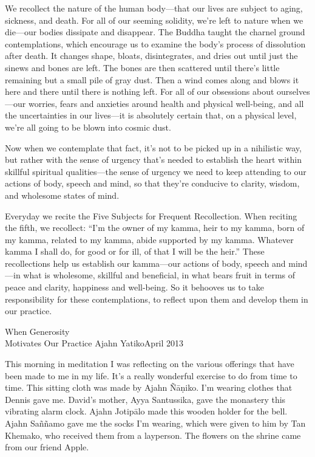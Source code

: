 We recollect the nature of the human body---that our lives are subject 
to aging, sickness, and death. For all of our seeming solidity, we're 
left to nature when we die---our bodies dissipate and disappear. The 
Buddha taught the charnel ground contemplations, which encourage us to 
examine the body's process of dissolution after death. It changes 
shape, bloats, disintegrates, and dries out until just the sinews and 
bones are left. The bones are then scattered until there's little 
remaining but a small pile of gray dust. Then a wind comes along and 
blows it here and there until there is nothing left. For all of our 
obsessions about ourselves---our worries, fears and anxieties around 
health and physical well-being, and all the uncertainties in our 
lives---it is absolutely certain that, on a physical level, we're all 
going to be blown into cosmic dust.

Now when we contemplate that fact, it's not to be picked up in a 
nihilistic way, but rather with the sense of urgency that's needed to 
establish the heart within skillful spiritual qualities---the sense of 
urgency we need to keep attending to our actions of body, speech and 
mind, so that they're conducive to clarity, wisdom, and wholesome 
states of mind.

Everyday we recite the Five Subjects for Frequent Recollection. When 
reciting the fifth, we recollect: ``I'm the owner of my kamma, heir to 
my kamma, born of my kamma, related to my kamma, abide supported by my 
kamma. Whatever kamma I shall do, for good or for ill, of that I will 
be the heir.'' These recollections help us establish our kamma---our 
actions of body, speech and mind---in what is wholesome, skillful and 
beneficial, in what bears fruit in terms of peace and clarity, 
happiness and well-being. So it behooves us to take responsibility for 
these contemplations, to reflect upon them and develop them in our 
practice.

{When Generosity\\Motivates Our Practice}
{Ajahn Yatiko}{April 2013}

This morning in meditation I was reflecting on the various offerings 
that have been made to me in my life. It's a really wonderful exercise 
to do from time to time. This sitting cloth was made by Ajahn 
Ñāṇiko. I'm wearing clothes that Dennis gave me. David's mother, 
Ayya Santussika, gave the monastery this vibrating alarm clock. Ajahn 
Jotipālo made this wooden holder for the bell. Ajahn Saññamo gave me 
the socks I'm wearing, which were given to him by Tan Khemako, who 
received them from a layperson. The flowers on the shrine came from our 
friend Apple.

